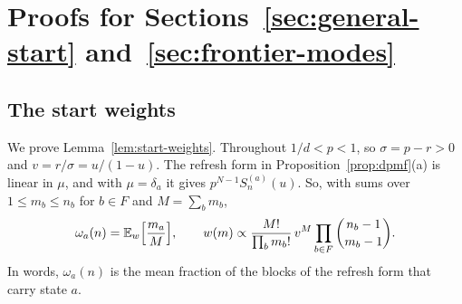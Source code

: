 \section{\texorpdfstring{Proofs for Sections~\ref{sec:general-start}
and~\ref{sec:frontier-modes}}{Proofs for the start and the field}}\label{app:start-field}

\subsection{The start weights}

We prove Lemma~\ref{lem:start-weights}. Throughout $1/d<p<1$, so $\sigma=p-r>0$
and $v=r/\sigma=u/(1-u)$. The refresh form in Proposition~\ref{prop:dpmf}(a) is
linear in $\mu$, and with $\mu=\delta_a$ it gives $p^{N-1}S^{(a)}_n(u)$. So, with
sums over $1\le m_b\le n_b$ for $b\in F$ and $M=\sum_bm_b$,
\begin{equation}\label{eq:startw-weights}
 \omega_a(n)=\mathbb E_w\Bigl[\frac{m_a}M\Bigr],\qquad
 w(m)\propto\frac{M!}{\prod_bm_b!}\,v^M\prod_{b\in F}\binom{n_b-1}{m_b-1}.
\end{equation}
In words, $\omega_a(n)$ is the mean fraction of the blocks of the refresh form
that carry state $a$.

